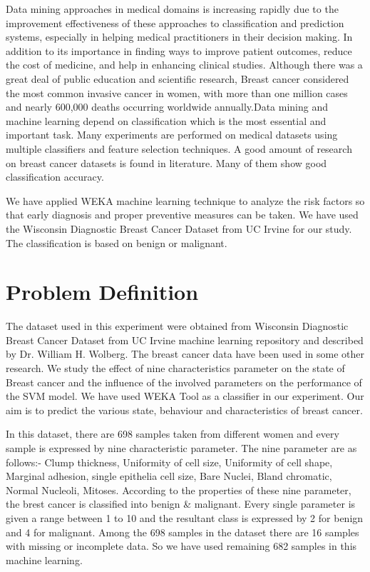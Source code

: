 \documentclass[11pt]{article}
\begin{document}
Data mining approaches in medical domains is increasing rapidly due to the improvement effectiveness of these approaches to classification and prediction systems, especially in helping medical practitioners in their decision making. In addition to its importance in finding ways to improve patient outcomes, reduce the cost of medicine, and help in enhancing clinical studies. Although there was a great deal of public education and scientific research, Breast cancer considered the most common invasive cancer in women, with more than one million cases and nearly 600,000 deaths occurring worldwide annually.Data mining and machine learning depend on classification which is the most essential and important task. Many experiments are performed on medical datasets using multiple classifiers and feature selection techniques. A good amount of research on breast cancer datasets is found in literature. Many of them show good classification accuracy.

We have applied WEKA machine learning technique to analyze the risk factors so that early diagnosis and proper preventive measures can be taken. We have used the Wisconsin Diagnostic Breast Cancer  Dataset from UC Irvine for our study. The classification is based on benign or malignant.




%
\section{Problem Definition}
The dataset used in this experiment were obtained from Wisconsin Diagnostic Breast Cancer Dataset from UC Irvine machine learning repository and described by Dr. William H. Wolberg. The breast cancer data have been used in some other research. We study the effect of nine characteristics parameter on the state of Breast cancer and the influence of the involved parameters on the performance of the SVM model. We have used WEKA Tool as a classifier in our experiment. Our aim is to predict the various state, behaviour and characteristics of breast cancer.

In this dataset, there are 698 samples taken from different women and every sample is expressed by nine characteristic parameter. The nine parameter are as follows:- Clump thickness, Uniformity of cell size, Uniformity of cell shape, Marginal adhesion, single epithelia cell size, Bare Nuclei, Bland chromatic, Normal Nucleoli, Mitoses. According to the properties of these nine parameter, the brest cancer is classified into benign \& malignant. Every single parameter is given a range between 1 to 10 and the resultant class is expressed by 2 for benign and 4 for malignant. Among the 698 samples in the dataset there are 16 samples with missing or incomplete data. So we have used remaining 682 samples in this machine learning.
\end{document}
